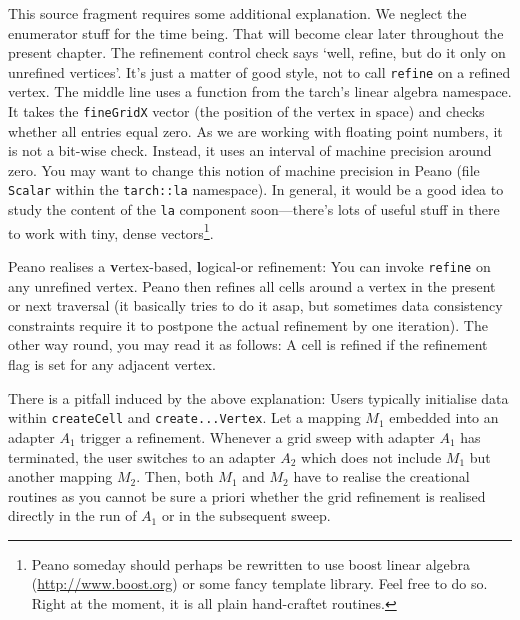 \noindent
This source fragment requires some additional explanation. 
We neglect the enumerator stuff for the time being.
That will become clear later throughout the present chapter.
The refinement control check says `well, refine, but do it only on unrefined
vertices'.
It's just a matter of good style, not to call \texttt{refine} on a refined
vertex.
The middle line uses a function from the tarch's linear algebra namespace. 
It takes the \texttt{fineGridX} vector (the position of the vertex in space) and
checks whether all entries equal zero.
As we are working with floating point numbers, it is not a bit-wise check. 
Instead, it uses an interval of machine precision around zero.
You may want to change this notion of machine precision in Peano (file
\texttt{Scalar} within the \texttt{tarch::la} namespace). 
In general, it would be a good idea to study the content of the \texttt{la}
component soon---there's lots of useful stuff in there to work with
tiny, dense vectors\footnote{Peano someday should perhaps be rewritten to use
boost linear algebra (\url{http://www.boost.org}) or some fancy template
library.
Feel free to do so.
Right at the moment, it is all plain hand-craftet routines.}.

\begin{remark}
  Peano realises a {\textbf vertex-based}, {\textbf logical-or} refinement: You can
  invoke \texttt{refine} on any unrefined vertex. Peano then refines all cells
  around a vertex in the present or next traversal (it basically tries to do it
  asap, but sometimes data consistency constraints require it to postpone the
  actual refinement by one iteration). The other way round, you may read it as
  follows: A cell is refined if the refinement flag is set for any adjacent
  vertex.
\end{remark}



\begin{remark}
  There is a pitfall induced by the above explanation: Users typically
  initialise data within \texttt{createCell} and \texttt{create...Vertex}.
  Let a mapping $M_1$ embedded into an adapter $A_1$ trigger a
  refinement. 
  Whenever a grid sweep with adapter $A_1$ has terminated, 
  the user switches to an adapter $A_2$ which does not include $M_1$ but
  another mapping $M_2$.
  Then, both $M_1$ and $M_2$ have to realise the creational routines as you
  cannot be sure a priori whether the grid refinement is realised directly in
  the run of $A_1$ or in the subsequent sweep.
\end{remark}



